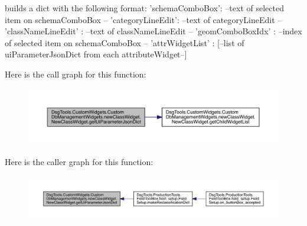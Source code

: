 \begin{DoxyVerb}builds a dict with the following format:
{
    'schemaComboBox': --text of selected item on schemaComboBox --
    'categoryLineEdit': --text of categoryLineEdit --
    'classNameLineEdit' : --text of classNameLineEdit --
    'geomComboBoxIdx' : --index of selected item on schemaComboBox --
    'attrWidgetList' : [--list of uiParameterJsonDict from each attributeWidget--]
}
\end{DoxyVerb}
 Here is the call graph for this function\+:
\nopagebreak
\begin{figure}[H]
\begin{center}
\leavevmode
\includegraphics[width=350pt]{class_dsg_tools_1_1_custom_widgets_1_1_custom_db_management_widgets_1_1new_class_widget_1_1_new_class_widget_a2398e0895e8788ff5df09922caac5b69_cgraph}
\end{center}
\end{figure}
Here is the caller graph for this function\+:
\nopagebreak
\begin{figure}[H]
\begin{center}
\leavevmode
\includegraphics[width=350pt]{class_dsg_tools_1_1_custom_widgets_1_1_custom_db_management_widgets_1_1new_class_widget_1_1_new_class_widget_a2398e0895e8788ff5df09922caac5b69_icgraph}
\end{center}
\end{figure}
\mbox{\label{class_dsg_tools_1_1_custom_widgets_1_1_custom_db_management_widgets_1_1new_class_widget_1_1_new_class_widget_aaec55aa688c84ae74a41be0a7276ef65}} 
